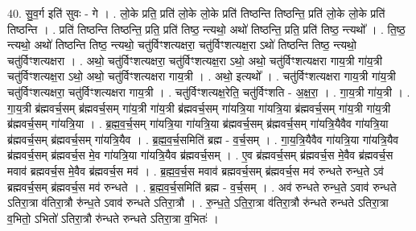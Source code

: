 \documentclass[17pt]{extarticle}
\begin{document}
40. सु॒व॒र्ग इति॑ सुवः - गे । . लो॒के प्रति॒ प्रति॑ लो॒के लो॒के प्रति॑ तिष्ठन्ति तिष्ठन्ति॒ प्रति॑ लो॒के लो॒के प्रति॑ तिष्ठन्ति । . प्रति॑ तिष्ठन्ति तिष्ठन्ति॒ प्रति॒ प्रति॑ तिष्ठ॒ न्त्यथो॒ अथो॑ तिष्ठन्ति॒ प्रति॒ प्रति॑ तिष्ठ॒ न्त्यथो᳚ । . ति॒ष्ठ॒ न्त्यथो॒ अथो॑ तिष्ठन्ति तिष्ठ॒ न्त्यथो॒ चतु॑र्विꣳशत्यक्षरा॒ चतु॑र्विꣳशत्यक्ष॒रा ऽथो॑ तिष्ठन्ति तिष्ठ॒ न्त्यथो॒ चतु॑र्विꣳशत्यक्षरा । . अथो॒ चतु॑र्विꣳशत्यक्षरा॒ चतु॑र्विꣳशत्यक्ष॒रा ऽथो॒ अथो॒ चतु॑र्विꣳशत्यक्षरा गाय॒त्री गा॑य॒त्री चतु॑र्विꣳशत्यक्ष॒रा ऽथो॒ अथो॒ चतु॑र्विꣳशत्यक्षरा गाय॒त्री । . अथो॒ इत्यथो᳚ । . चतु॑र्विꣳशत्यक्षरा गाय॒त्री गा॑य॒त्री चतु॑र्विꣳशत्यक्षरा॒ चतु॑र्विꣳशत्यक्षरा गाय॒त्री । . चतु॑र्विꣳशत्यक्ष॒रेति॒ चतु॑र्विꣳशति - अ॒क्ष॒रा॒ । . गा॒य॒त्री गा॑य॒त्री । . गा॒य॒त्री ब्र॑ह्मवर्च॒सम् ब्र॑ह्मवर्च॒सम् गा॑य॒त्री गा॑य॒त्री ब्र॑ह्मवर्च॒सम् गा॑यत्रि॒या गा॑यत्रि॒या ब्र॑ह्मवर्च॒सम् गा॑य॒त्री गा॑य॒त्री ब्र॑ह्मवर्च॒सम् गा॑यत्रि॒या । . ब्र॒ह्म॒व॒र्च॒सम् गा॑यत्रि॒या गा॑यत्रि॒या ब्र॑ह्मवर्च॒सम् ब्र॑ह्मवर्च॒सम् गा॑यत्रि॒यैवैव गा॑यत्रि॒या ब्र॑ह्मवर्च॒सम् ब्र॑ह्मवर्च॒सम् गा॑यत्रि॒यैव । . ब्र॒ह्म॒व॒र्च॒समिति॑ ब्रह्म - व॒र्च॒सम् । . गा॒य॒त्रि॒यैवैव गा॑यत्रि॒या गा॑यत्रि॒यैव ब्र॑ह्मवर्च॒सम् ब्र॑ह्मवर्च॒स मे॒व गा॑यत्रि॒या गा॑यत्रि॒यैव ब्र॑ह्मवर्च॒सम् । . ए॒व ब्र॑ह्मवर्च॒सम् ब्र॑ह्मवर्च॒स मे॒वैव ब्र॑ह्मवर्च॒स मवाव॑ ब्रह्मवर्च॒स मे॒वैव ब्र॑ह्मवर्च॒स मव॑ । . ब्र॒ह्म॒व॒र्च॒स मवाव॑ ब्रह्मवर्च॒सम् ब्र॑ह्मवर्च॒स मव॑ रुन्धते रुन्ध॒ते ऽव॑ ब्रह्मवर्च॒सम् ब्र॑ह्मवर्च॒स मव॑ रुन्धते । . ब्र॒ह्म॒व॒र्च॒समिति॑ ब्रह्म - व॒र्च॒सम् । . अव॑ रुन्धते रुन्ध॒ते ऽवाव॑ रुन्धते ऽतिरा॒त्रा व॑तिरा॒त्रौ रु॑न्ध॒ते ऽवाव॑ रुन्धते ऽतिरा॒त्रौ । . रु॒न्ध॒ते॒ ऽति॒रा॒त्रा व॑तिरा॒त्रौ रु॑न्धते रुन्धते ऽतिरा॒त्रा व॒भितो॒ ऽभितो॑ ऽतिरा॒त्रौ रु॑न्धते रुन्धते ऽतिरा॒त्रा व॒भितः॑ । \newline
\end{document}
